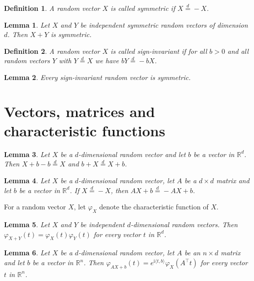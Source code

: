 \documentclass{article}
\newtheorem{lemma}{Lemma}
\newtheorem{definition}{Definition}
\begin{document}
\begin{definition}\label{symmetric}
A random vector $X$ is called \emph{symmetric} if $X\stackrel{d}{=}-X$.
\end{definition}

\begin{lemma}\label{sums}
Let $X$ and $Y$ be independent symmetric random vectors of dimension $d$. Then $X+Y$ is symmetric.
\end{lemma}

\begin{definition}\label{invariant}
A random vector $X$ is called \emph{sign-invariant} if for all $b>0$ and all random vectors $Y$ with $Y\stackrel{d}{=}X$ we have $bY\stackrel{d}{=}-bX$.
\end{definition}

\begin{lemma}\label{invariant-symmetric}
Every sign-invariant random vector is symmetric.
\end{lemma}

\section{Vectors, matrices and characteristic functions}

\begin{lemma}\label{shift}
Let $X$ be a $d$-dimensional random vector and let $b$ be a vector in $\mathbb{R}^d$. Then $X+b-b\stackrel{d}{=}X$ and $b+X\stackrel{d}{=}X+b$.
\end{lemma}

\begin{lemma}\label{affine-symmetric}
Let $X$ be a $d$-dimensional random vector, let $A$ be a $d\times d$ matrix and let $b$ be a vector in $\mathbb{R}^d$. If $X\stackrel{d}{=}-X$, then $AX+b\stackrel{d}{=}-AX+b$.
\end{lemma}

For a random vector $X$, let $\varphi_X$ denote the characteristic function of $X$.

\begin{lemma}\label{convolution}
Let $X$ and $Y$ be independent $d$-dimensional random vectors. Then $\varphi_{X+Y}(t)=\varphi_X(t)\varphi_Y(t)$ for every vector $t$ in $\mathbb{R}^d$.
\end{lemma}

\begin{lemma}\label{affine}
Let $X$ be a $d$-dimensional random vector, let $A$ be an $n\times d$ matrix and let $b$ be a vector in $\mathbb{R}^n$. Then $\varphi_{AX+b}(t)=e^{\mathrm{i}\langle t,b\rangle}\varphi_X(A^{\top}t)$ for every vector $t$ in $\mathbb{R}^n$.
\end{lemma}
\end{document}
